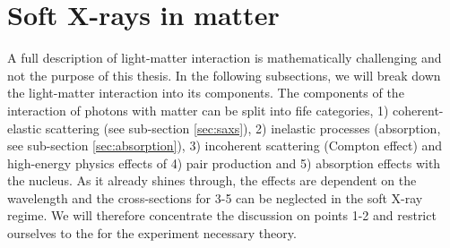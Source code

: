 \section{Soft X-rays in matter}\label{sec:light-matter-interaction}
A full description of light-matter interaction is mathematically challenging and not the purpose of this thesis. In the following subsections, we will break down the light-matter interaction into its components. The components of the interaction of photons with matter can be split into fife categories, 1) coherent-elastic scattering (see sub-section \ref{sec:saxs}), 2) inelastic processes (absorption, see sub-section \ref{sec:absorption}), 3) incoherent scattering (Compton effect) and high-energy physics effects of 4) pair production and 5) absorption effects with the nucleus. As it already shines through, the effects are dependent on the wavelength and the cross-sections for 3-5 can be neglected in the soft X-ray regime. We will therefore concentrate the discussion on points 1-2 and restrict ourselves to the for the experiment necessary theory.
%
%
%
